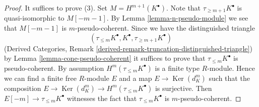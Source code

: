 \documentclass[10pt,a4paper]{amsart}
\theoremstyle{plain}
\theoremstyle{definition}
\theoremstyle{remark}
\numberwithin{equation}{subsection}
\def\Ker{\mathop{\mathrm{Ker}}}
\begin{document}
\begin{proof}
It suffices to prove (3). Set $M = H^{m + 1}(K^\bullet)$.
Note that $\tau_{\geq m + 1}K^\bullet$ is quasi-isomorphic to
$M[- m - 1]$. By
Lemma \ref{lemma-n-pseudo-module}
we see that $M[- m - 1]$ is $m$-pseudo-coherent. Since we have
the distinguished triangle
$$
(\tau_{\leq m}K^\bullet, K^\bullet, \tau_{\geq m + 1}K^\bullet)
$$
(Derived Categories, Remark
\ref{derived-remark-truncation-distinguished-triangle}) by
Lemma \ref{lemma-cone-pseudo-coherent}
it suffices to prove that $\tau_{\leq m}K^\bullet$ is pseudo-coherent.
By assumption $H^m(\tau_{\leq m}K^\bullet)$ is a finite type $R$-module.
Hence we can find a finite free $R$-module $E$ and a map
$E \to \Ker(d_K^m)$ such that the composition
$E \to \Ker(d_K^m) \to H^m(\tau_{\leq m}K^\bullet)$ is surjective.
Then $E[-m] \to \tau_{\leq m}K^\bullet$ witnesses the fact
that $\tau_{\leq m}K^\bullet$ is $m$-pseudo-coherent.
\end{proof}
\end{document}
